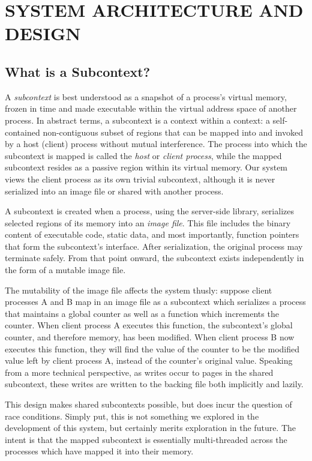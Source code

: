 \chapter*{SYSTEM ARCHITECTURE AND DESIGN}
\thispagestyle{fancy}

\section*{What is a Subcontext?}
A \textit{subcontext} is best understood as a snapshot of a process’s virtual memory, frozen in time and made executable within the virtual address space of another process. In abstract terms, a subcontext is a context within a context: a self-contained non-contiguous subset of regions that can be mapped into and invoked by a host (client) process without mutual interference. The process into which the subcontext is mapped is called the \textit{host} or \textit{client process}, while the mapped subcontext resides as a passive region within its virtual memory. Our system views the client process as its own trivial subcontext, although it is never serialized into an image file or shared with another process.

A subcontext is created when a process, using the server-side library, serializes selected regions of its memory into an \textit{image file}. This file includes the binary content of executable code, static data, and most importantly, function pointers that form the subcontext's interface. After serialization, the original process may terminate safely. From that point onward, the subcontext exists independently in the form of a mutable image file.

The mutability of the image file affects the system thusly: suppose client processes A and B map in an image file as a subcontext which serializes a process that maintains a global counter as well as a function which increments the counter. When client process A executes this function, the subcontext's global counter, and therefore memory, has been modified. When client process B now executes this function, they will find the value of the counter to be the modified value left by client process A, instead of the counter's original value. Speaking from a more technical perspective, as writes occur to pages in the shared subcontext, these writes are written to the backing file both implicitly and lazily.

This design makes shared subcontexts possible, but does incur the question of race conditions. Simply put, this is not something we explored in the development of this system, but certainly merits exploration in the future. The intent is that the mapped subcontext is essentially multi-threaded across the processes which have mapped it into their memory. 

